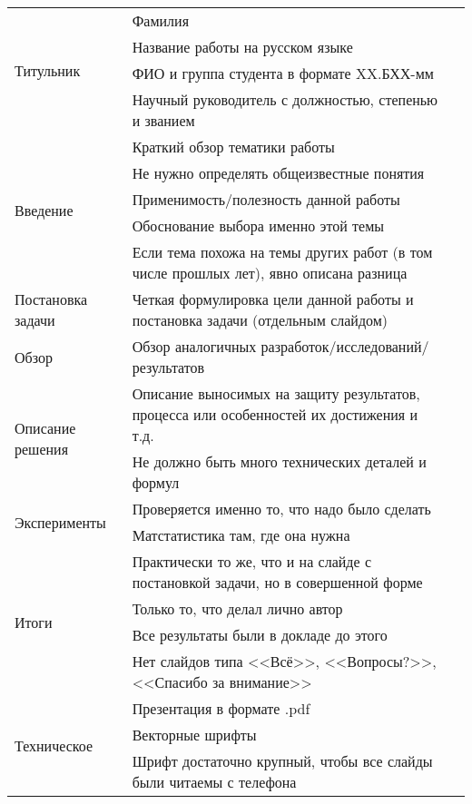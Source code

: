 \documentclass{article}
\begin{document}
\begin{tabular}{ |l|l|l| }
    \hline
    \multirow{4}{*}{Титульник} & Фамилия & \\ \cline{2-3}
    & Название работы на русском языке & \\ \cline{2-3}
    & ФИО и группа студента в формате XX.БХХ-мм & \\ \cline{2-3}
    & Научный руководитель с должностью, степенью и званием & \\ \hline
    \multirow{5}{*}{Введение} & Краткий обзор тематики работы & \\ \cline{2-3}
    & Не нужно определять общеизвестные понятия & \\ \cline{2-3}
    & Применимость/полезность данной работы & \\ \cline{2-3}
    & Обоснование выбора именно этой темы & \\ \cline{2-3}
    & Если тема похожа на темы других работ (в том числе прошлых лет), явно описана разница & \\ \hline
    Постановка задачи & Четкая формулировка цели данной работы и постановка задачи (отдельным слайдом) & \\ \hline
    Обзор & Обзор аналогичных разработок/исследований/результатов & \\ \hline
    \multirow{2}{*}{Описание решения} & Описание выносимых на защиту результатов, процесса или особенностей их достижения и т.д. & \\ \cline{2-3}
    & Не должно быть много технических деталей и формул & \\ \hline
    \multirow{2}{*}{Эксперименты} & Проверяется именно то, что надо было сделать & \\ \cline{2-3}
    & Матстатистика там, где она нужна & \\ \hline
    \multirow{4}{*}{Итоги} & Практически то же, что и на слайде с постановкой задачи, но в совершенной форме & \\ \cline{2-3}
    & Только то, что делал лично автор & \\ \cline{2-3}
    & Все результаты были в докладе до этого & \\ \cline{2-3}
    & Нет слайдов типа <<Всё>>, <<Вопросы?>>, <<Спасибо за внимание>> & \\ \hline
    \multirow{7}{*}{Техническое} & Презентация в формате .pdf & \\ \cline{2-3}
    & Векторные шрифты & \\ \cline{2-3}
    & Шрифт достаточно крупный, чтобы все слайды были читаемы с телефона & \\ \cline{2-3}

\end{tabular}
\end{document}
